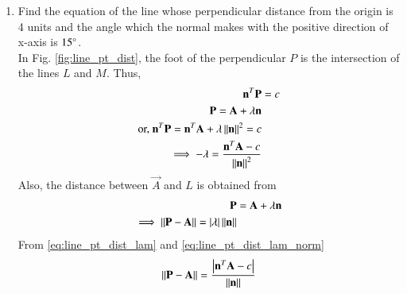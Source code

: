 \begin{enumerate}[label=\arabic*.,ref=\thesubsection.\theenumi]
\item Find the equation of the line whose perpendicular distance from the origin is 4 units and the angle which the normal makes with the positive direction of x-axis is $15\degree$.
%
\\
\solution  In Fig. \ref{fig:line_pt_dist}, the foot of the perpendicular $P$ is the intersection of the lines $L$ and $M$.  Thus, 
\begin{align}
\label{eq:line_pt_dist_foot}
\mathbf{n}^T\mathbf{P} &= c
\\
\label{eq:line_pt_dist_foot_normal}
\mathbf{P} = \mathbf{A} + \lambda\mathbf{n}
\\
\text{or, } \mathbf{n}^T\mathbf{P} = \mathbf{n}^T\mathbf{A} + \lambda\left\lVert\mathbf{n}\right\rVert^2 = c
\\
\label{eq:line_pt_dist_lam}
\implies -\lambda = \frac{\mathbf{n}^T\mathbf{A}-c}{\left\lVert\mathbf{n}\right\rVert^2}
\end{align}
%
Also, the distance between $\vec{A}$ and $L$ is obtained from 
%
\begin{align}
\mathbf{P} &= \mathbf{A} + \lambda\mathbf{n}
\\
\label{eq:line_pt_dist_lam_norm}
\implies \left\lVert\mathbf{P} - \mathbf{A}\right\rVert  = \left\vert\lambda\right\vert\left\lVert\mathbf{n}\right\rVert
\end{align}
%
From \eqref{eq:line_pt_dist_lam}
and \eqref{eq:line_pt_dist_lam_norm}
%
\begin{align}
\label{eq:line_pt_dist}
\left\lVert\mathbf{P} - \mathbf{A}\right\rVert  = \frac{\left\vert\mathbf{n}^T\mathbf{A}-c\right\vert}{\left\lVert\mathbf{n}\right\rVert}
\end{align}
%


\end{enumerate}
